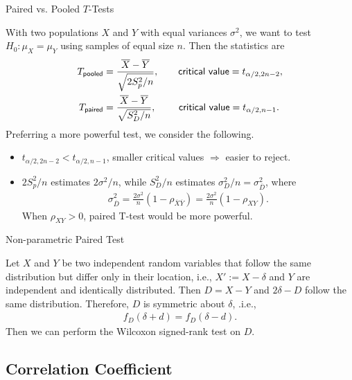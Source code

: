 \begin{frame}{Paired vs. Pooled $T$-Tests}

\justifying
With two populations $X$ and $Y$ with equal variances $\sigma^2$, we want to test $H_0: \mu_X = \mu_Y$ using samples of equal size $n$. Then the statistics are
\footnotesize
\begin{align*}
T_{\mathsf{pooled}} & = \frac{\overline{X} - \overline{Y}}{\sqrt{2S_p^2/n}}, \qquad  \mathsf{critical\ value} = t_{\alpha/2,2n-2}, \\
T_{\mathsf{paired}} & = \frac{\overline{X}-\overline{Y}}{\sqrt{S_D^2/n}}, \qquad\ \mathsf{critical\ value} = t_{\alpha/2,n-1}.
\end{align*}
\normalsize
Preferring a more powerful test, we consider the following.
\begin{itemize}
	\justifying
	\item $t_{\alpha/2,2n-2} < t_{\alpha/2,n-1}$, smaller critical values $\Rightarrow$ easier to reject.
	\item $2S_p^2/n$ estimates $2\sigma^2/n$, while $S_D^2/n$ estimates $\sigma_D^2/n = \sigma_{\overline{D}}^2$, where
	\footnotesize
	\begin{align*}
	\sigma_{\overline{D}}^2 = \frac{2\sigma^2}{n}(1-\rho_{\overline{X}\overline{Y}}) = \frac{2\sigma^2}{n}(1-\rho_{XY}).
	\end{align*}
	\normalsize
	When $\rho_{XY} > 0$, paired T-test would be more powerful.
\end{itemize}

\end{frame}


\begin{frame}{Non-parametric Paired Test}

\justifying
{} Let $X$ and $Y$ be two independent random variables that follow the same distribution but differ only in their location, i.e., $X':=X-\delta$ and $Y$ are independent and identically distributed. Then $D = X - Y$ and $2\delta-D$ follow the same distribution. Therefore, $D$ is symmetric about $\delta$, .i.e.,
\begin{align*}
f_D(\delta+d) = f_D(\delta-d).
\end{align*}
Then we can perform the Wilcoxon signed-rank test on $D$.

\end{frame}


\subsection{Correlation Coefficient}


